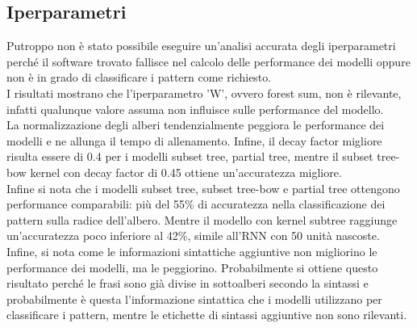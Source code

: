 \subsection{Iperparametri}

Putroppo non è stato possibile eseguire un'analisi accurata degli iperparametri
perché il software trovato fallisce nel calcolo delle performance dei modelli
oppure non è in grado di classificare i pattern come richiesto.\\
I risultati mostrano che l'iperparametro 'W', ovvero forest sum, non è
rilevante, infatti qualunque valore assuma non influisce sulle performance del
modello.\\
La normalizzazione degli alberi tendenzialmente peggiora le performance dei 
modelli e ne allunga il tempo di allenamento. 
Infine, il decay factor migliore risulta essere di 0.4 per i modelli subset
tree, partial tree, mentre il subset tree-bow kernel con decay factor di 0.45
ottiene un'accuratezza migliore.\\
Infine si nota che i modelli subset tree, subset tree-bow e partial tree
ottengono performance comparabili: più del 55\% di accuratezza nella
classificazione dei pattern sulla radice dell'albero. Mentre il modello con
kernel subtree raggiunge un'accuratezza poco inferiore al 42\%, simile all'RNN
con 50 unità nascoste.\\
Infine, si nota come le informazioni sintattiche aggiuntive non migliorino le
performance dei modelli, ma le peggiorino. Probabilmente si ottiene questo
risultato perché le frasi sono già divise in sottoalberi secondo la sintassi e
probabilmente è questa l'informazione sintattica che i modelli utilizzano per
classificare i pattern, mentre le etichette di sintassi aggiuntive non sono
rilevanti.
